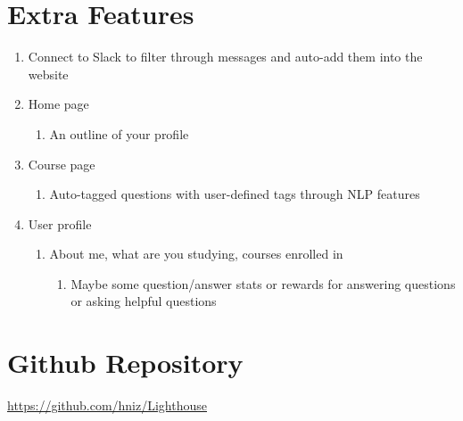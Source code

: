 \documentclass[preprint,11pt,3p]{article}
\begin{document}
\newpage
\section{Extra Features}
\begin{enumerate}
	\item Connect to Slack to filter through messages and auto-add them into the website
	\item Home page
		\begin{enumerate}
			\item An outline of your profile
		\end{enumerate}
	\item Course page
		\begin{enumerate}	
			\item Auto-tagged questions with user-defined tags through NLP features 
		\end{enumerate}	
	\item User profile
		\begin{enumerate}
			\item About me, what are you studying, courses enrolled in
				\begin{enumerate}
					\item Maybe some question/answer stats or rewards for answering questions or asking helpful questions
				\end{enumerate}
		\end{enumerate}
\end{enumerate}

\section{Github Repository}
\href{https://github.com/hniz/Lighthouse}{https://github.com/hniz/Lighthouse}
\end{document}
